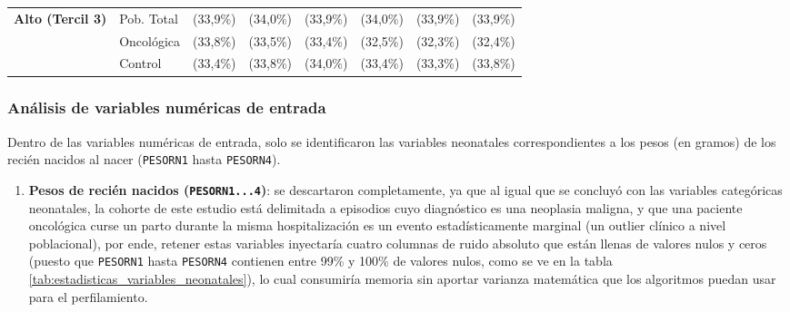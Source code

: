 \begin{table}[htbp]
\begin{tabular}{|c|l|c|c|c|c|c|c|}
\parbox[t]{1.8cm}{\textbf{Alto (Tercil 3)}} 
& \parbox[t]{1.5cm}{Pob. Total} & \parbox[t]{2cm}{ (33,9\%)} & \parbox[t]{2cm}{ (34,0\%)} & \parbox[t]{2cm}{ (33,9\%)} & \parbox[t]{2cm}{ (34,0\%)} & \parbox[t]{2cm}{ (33,9\%)} & \parbox[t]{2cm}{ (33,9\%)} \\ 
\parbox[t]{1.8cm}{} 
& \parbox[t]{1.5cm}{Oncológica} & \parbox[t]{2cm}{ (33,8\%)} & \parbox[t]{2cm}{ (33,5\%)} & \parbox[t]{2cm}{ (33,4\%)} & \parbox[t]{2cm}{ (32,5\%)} & \parbox[t]{2cm}{ (32,3\%)} & \parbox[t]{2cm}{ (32,4\%)} \\ 
\parbox[t]{1.8cm}{} 
& \parbox[t]{1.5cm}{Control} & \parbox[t]{2cm}{ (33,4\%)} & \parbox[t]{2cm}{ (33,8\%)} & \parbox[t]{2cm}{ (34,0\%)} & \parbox[t]{2cm}{ (33,4\%)} & \parbox[t]{2cm}{ (33,3\%)} & \parbox[t]{2cm}{ (33,8\%)} \\ \hline
\end{tabular}
\end{table}




\subsubsection{Análisis de variables numéricas de entrada}

Dentro de las variables numéricas de entrada, solo se identificaron las variables neonatales correspondientes a los pesos (en gramos) de los recién nacidos al nacer (\texttt{PESORN1} hasta \texttt{PESORN4}).
\begin{enumerate}
    \item \textbf{Pesos de recién nacidos (\texttt{PESORN1...4})}: se descartaron completamente, ya que al igual que se concluyó con las variables categóricas neonatales, la cohorte de este estudio está delimitada a episodios cuyo diagnóstico es una neoplasia maligna, y que una paciente oncológica curse un parto durante la misma hospitalización es un evento estadísticamente marginal (un outlier clínico a nivel poblacional), por ende, retener estas variables inyectaría cuatro columnas de ruido absoluto que están llenas de valores nulos y ceros (puesto que \texttt{PESORN1} hasta \texttt{PESORN4} contienen entre 99\% y 100\% de valores nulos, como se ve en la tabla \ref{tab:estadisticas_variables_neonatales}), lo cual consumiría memoria sin aportar varianza matemática que los algoritmos puedan usar para el perfilamiento.
\end{enumerate}


